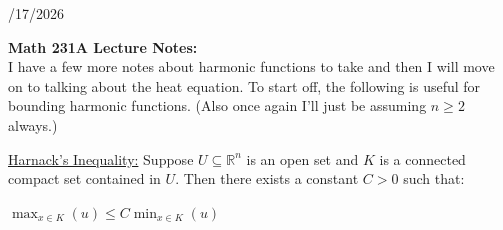 \documentclass{book}
\newcommand{\hTwo}{%
\color{Black}%
   \fontsize{13}{15}\selectfont%
}
\newcommand{\exTwo}{%
   \color{Purple}%
   \fontsize{13}{15}\selectfont%
}
\newcommand{\blect}[1]{{\color{MidnightBlue}\textbf{#1}}}
\newcommand{\retTwo}{\hfill\bigbreak}
\newcommand{\dispDate}[1]{{
   \color{Black}%
   \fontsize{20}{18}\selectfont%
   #1\retTwo
}}
\begin{document}
\setul{0.14em}{0.07em}
\calibri

\hTwo\dispDate{10/17/2026}


\blect{Math 231A Lecture Notes:}\\

I have a few more notes about harmonic functions to take and then I will move on to talking about the heat equation. To start off, the following is useful for bounding harmonic functions. (Also once again I'll just be assuming $n \geq 2$ always.)\retTwo

\exTwo\ul{Harnack's Inequality:} Suppose $U \subseteq \mathbb{R}^n$ is an open set and $K$ is a connected compact set contained in $U$. Then there exists a constant $C > 0$ such that:

{\centering$\max_{x \in K}(u) \leq C \min_{x \in K}(u)$\\[4pt]\par}
\end{document}

